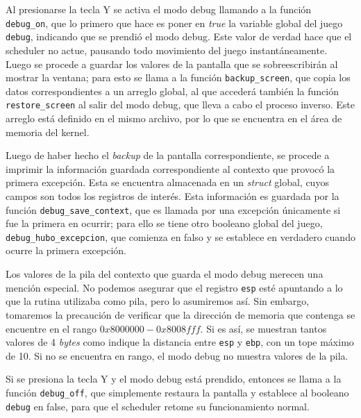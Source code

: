 \documentclass{article}
\begin{document}
	Al presionarse la tecla Y se activa el modo debug llamando a la función \texttt{debug\_on}, que lo primero que hace es poner en \textit{true} la variable global del juego \texttt{debug}, indicando que se prendió el modo debug. Este valor de verdad hace que el scheduler no actue, pausando todo movimiento del juego instantáneamente. Luego se procede a guardar los valores de la pantalla que se sobreescribirán al mostrar la ventana; para esto se llama a la función \texttt{backup\_screen}, que copia los datos correspondientes a un arreglo global, al que accederá también la función \texttt{restore\_screen} al salir del modo debug, que lleva a cabo el proceso inverso. Este arreglo está definido en el mismo archivo, por lo que se encuentra en el área de memoria del kernel.

	Luego de haber hecho el \textit{backup} de la pantalla correspondiente, se procede a imprimir la información guardada correspondiente al contexto que provocó la primera excepción. Esta se encuentra almacenada en un \textit{struct} global, cuyos campos son todos los registros de interés. Esta información es guardada por la función \texttt{debug\_save\_context}, que  es llamada por una excepción únicamente si fue la primera en ocurrir; para ello se tiene otro booleano global del juego, \texttt{debug\_hubo\_excepcion}, que comienza en falso y se establece en verdadero cuando ocurre la primera excepción.

	Los valores de la pila del contexto que guarda el modo debug merecen una mención especial. No
    podemos asegurar que el registro \texttt{esp} esté apuntando a lo que la rutina utilizaba como
    pila, pero lo asumiremos así. Sin embargo, tomaremos la precaución de verificar que la dirección
    de memoria que contenga se encuentre en el rango $0x8000000 - 0x8008fff$. Si es así, se muestran tantos valores de 4 \textit{bytes} como indique la distancia entre \texttt{esp} y \texttt{ebp}, con un tope máximo de 10. Si no se encuentra en rango, el modo debug no muestra valores de la pila.

	Si se presiona la tecla Y y el modo debug está prendido, entonces se llama a la función \texttt{debug\_off}, que simplemente restaura la pantalla y establece al booleano \texttt{debug} en false, para que el scheduler retome su funcionamiento normal.
\end{document}
